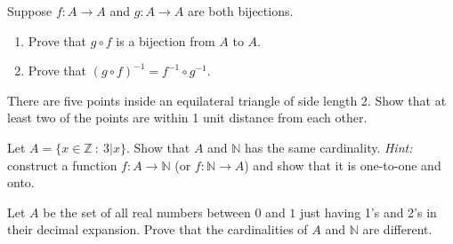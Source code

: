 \documentclass{article}
\newcommand{\Z}{\mathbb{Z}}
\theoremstyle{definition}
\begin{document}
\begin{question}
    Suppose $f: A \rightarrow A$ and $g: A \rightarrow A$ are both bijections.
    \begin{enumerate}
    \item Prove that $g \circ f$ is a bijection from $A$ to $A$.
    \item Prove that $(g \circ f)^{-1} = f^{-1} \circ g^{-1}$.
    \end{enumerate}
\end{question}
\begin{solution}
\end{solution}

\begin{question}
    There are five points inside an equilateral triangle of side length 2. Show that at least two of the points are within 1 unit distance from each other.
\end{question}
\begin{solution}
\end{solution}


\begin{question}
    Let $A = \{ x \in \Z ~:~ 3|x \}$.  Show that $A$ and $\mathbb{N}$ has the same cardinality.  {\it Hint:} construct a function $f: A \rightarrow \mathbb{N}$ (or $f: \mathbb{N} \rightarrow A$) and show that it is one-to-one and onto.
\end{question}
\begin{solution}
\end{solution}

\begin{question}
    Let $A$ be the set of all real numbers between $0$ and $1$ just having 1's and 2's in their decimal expansion. Prove that the cardinalities of $A$ and $\mathbb{N}$ are different.
\end{question}
\begin{solution}
\end{solution}
\end{document}
